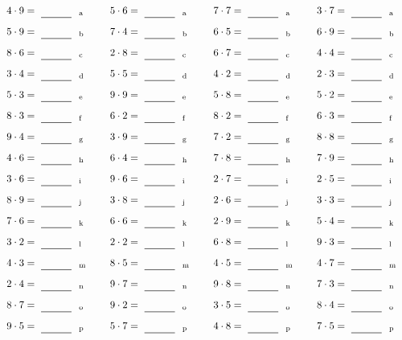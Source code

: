 \documentclass
[
  draft    = true,
  fontsize = 11pt,
  parskip  = half-
]
{scrartcl}
\begin{document}
\par\vfill\par
\begin{align*}
    \pline{4\cdot9}&=\rline{a}
  & \pline{5\cdot6}&=\rline{a}
  & \pline{7\cdot7}&=\rline{a}
  & \pline{3\cdot7}&=\rline{a} \\[1ex]
    \pline{5\cdot9}&=\rline{b}
  & \pline{7\cdot4}&=\rline{b}
  & \pline{6\cdot5}&=\rline{b}
  & \pline{6\cdot9}&=\rline{b} \\[1ex]
    \pline{8\cdot6}&=\rline{c}
  & \pline{2\cdot8}&=\rline{c}
  & \pline{6\cdot7}&=\rline{c}
  & \pline{4\cdot4}&=\rline{c} \\[1ex]
    \pline{3\cdot4}&=\rline{d}
  & \pline{5\cdot5}&=\rline{d}
  & \pline{4\cdot2}&=\rline{d}
  & \pline{2\cdot3}&=\rline{d} \\[1ex]
    \pline{5\cdot3}&=\rline{e}
  & \pline{9\cdot9}&=\rline{e}
  & \pline{5\cdot8}&=\rline{e}
  & \pline{5\cdot2}&=\rline{e} \\[1ex]
    \pline{8\cdot3}&=\rline{f}
  & \pline{6\cdot2}&=\rline{f}
  & \pline{8\cdot2}&=\rline{f}
  & \pline{6\cdot3}&=\rline{f} \\[1ex]
    \pline{9\cdot4}&=\rline{g}
  & \pline{3\cdot9}&=\rline{g}
  & \pline{7\cdot2}&=\rline{g}
  & \pline{8\cdot8}&=\rline{g} \\[1ex]
    \pline{4\cdot6}&=\rline{h}
  & \pline{6\cdot4}&=\rline{h}
  & \pline{7\cdot8}&=\rline{h}
  & \pline{7\cdot9}&=\rline{h} \\[1ex]
    \pline{3\cdot6}&=\rline{i}
  & \pline{9\cdot6}&=\rline{i}
  & \pline{2\cdot7}&=\rline{i}
  & \pline{2\cdot5}&=\rline{i} \\[1ex]
    \pline{8\cdot9}&=\rline{j}
  & \pline{3\cdot8}&=\rline{j}
  & \pline{2\cdot6}&=\rline{j}
  & \pline{3\cdot3}&=\rline{j} \\[1ex]
    \pline{7\cdot6}&=\rline{k}
  & \pline{6\cdot6}&=\rline{k}
  & \pline{2\cdot9}&=\rline{k}
  & \pline{5\cdot4}&=\rline{k} \\[1ex]
    \pline{3\cdot2}&=\rline{l}
  & \pline{2\cdot2}&=\rline{l}
  & \pline{6\cdot8}&=\rline{l}
  & \pline{9\cdot3}&=\rline{l} \\[1ex]
    \pline{4\cdot3}&=\rline{m}
  & \pline{8\cdot5}&=\rline{m}
  & \pline{4\cdot5}&=\rline{m}
  & \pline{4\cdot7}&=\rline{m} \\[1ex]
    \pline{2\cdot4}&=\rline{n}
  & \pline{9\cdot7}&=\rline{n}
  & \pline{9\cdot8}&=\rline{n}
  & \pline{7\cdot3}&=\rline{n} \\[1ex]
    \pline{8\cdot7}&=\rline{o}
  & \pline{9\cdot2}&=\rline{o}
  & \pline{3\cdot5}&=\rline{o}
  & \pline{8\cdot4}&=\rline{o} \\[1ex]
    \pline{9\cdot5}&=\rline{p}
  & \pline{5\cdot7}&=\rline{p}
  & \pline{4\cdot8}&=\rline{p}
  & \pline{7\cdot5}&=\rline{p}
\end{align*}
\end{document}

